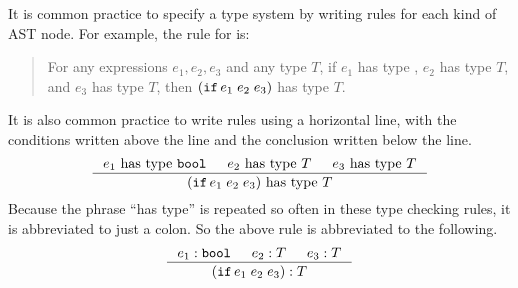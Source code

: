 \documentclass[12pt]{book}
\begin{document}

It is common practice to specify a type system by writing rules for
each kind of AST node. For example, the rule for  is:
\begin{quote}
  For any expressions $e_1, e_2, e_3$ and any type $T$, if $e_1$ has
  type , $e_2$ has type $T$, and $e_3$ has type $T$, then
  $(\texttt{if}\,e_1\;e_2\;e_3)$ has type $T$.
\end{quote}
It is also common practice to write rules using a horizontal line,
with the conditions written above the line and the conclusion written
below the line.
\begin{equation*}
  \inference{e_1 \text{ has type } \key{bool} & 
        e_2 \text{ has type } T & e_3 \text{ has type } T}
  {\IF{e_1}{e_2}{e_3} \text{ has type } T}
\end{equation*}
Because the phrase ``has type'' is repeated so often in these type
checking rules, it is abbreviated to just a colon. So the above rule
is abbreviated to the following.
\begin{equation*}
  \inference{e_1 : \key{bool} & e_2 : T & e_3 : T}
            {\IF{e_1}{e_2}{e_3} : T}
\end{equation*}
\end{document}
